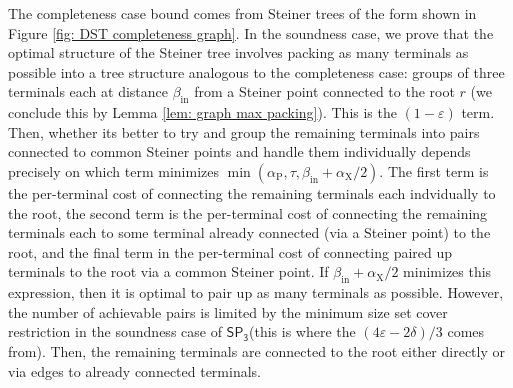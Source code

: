 \documentclass{theoretics}
\newcommand{\1}{\textbf{1}}
\newcommand{\setpT}{$\mathsf{SP_3}$\xspace}
\newcommand{\td}{\tau}
\newcommand{\srd}{\alpha_{\text{X}}}
\newcommand{\trd}{\alpha_{\text{P}}}
\begin{document}
\begin{remark}
The completeness case bound comes from Steiner trees of the form shown in Figure \ref{fig: DST completeness graph}. In the soundness case, we prove that the optimal structure of the Steiner tree involves packing as many terminals as possible into a tree structure analogous to the completeness case: groups of three terminals each at distance $\beta_{\text{in}}$ from a Steiner point connected to the root $r$ (we conclude this by Lemma \ref{lem: graph max packing}). This is the $(1-\varepsilon)$ term. Then, whether its better to try and group the remaining terminals into pairs connected to common Steiner points and handle them individually depends precisely on which term minimizes $\min(\trd, \td, \beta_{\text{in}} + \srd/2)$. The first term is the per-terminal cost of connecting the remaining terminals each indvidually to the root, the second term is the per-terminal cost of connecting the remaining terminals each to some terminal already connected (via a Steiner point) to the root, and the final term in the per-terminal cost of connecting paired up terminals to the root via a common Steiner point. If $\beta_{\text{in}} + \srd/2$ minimizes this expression, then it is optimal to pair up as many terminals as possible. However, the number of achievable pairs is limited by the minimum size set cover restriction in the soundness case of \setpT (this is where the $(4\varepsilon - 2\delta)/3$ comes from). Then, the remaining terminals are connected to the root either directly or via edges to already connected terminals.
\end{remark}
\end{document}
